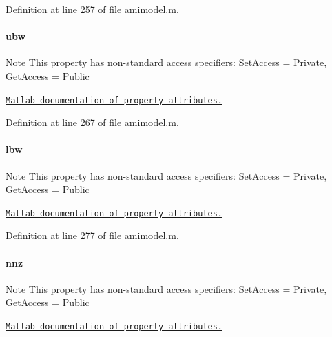 Definition at line 257 of file amimodel.\+m.

\hypertarget{classamimodel_a955c9d10635afed4ebc04c60010e5d40}{}
\paragraph[{ubw}]{\setlength{\rightskip}{0pt plus 5cm}ubw}\label{classamimodel_a955c9d10635afed4ebc04c60010e5d40}
\begin{DoxyNote}{Note}
This property has non-\/standard access specifiers\+: {\ttfamily Set\+Access = Private, Get\+Access = Public} 

\href{http://www.mathworks.com/help/matlab/matlab_oop/property-attributes.html}{\tt Matlab documentation of property attributes.} 
\end{DoxyNote}


Definition at line 267 of file amimodel.\+m.

\hypertarget{classamimodel_a784f5fb2b8eda576179be087c2a09a39}{}
\paragraph[{lbw}]{\setlength{\rightskip}{0pt plus 5cm}lbw}\label{classamimodel_a784f5fb2b8eda576179be087c2a09a39}
\begin{DoxyNote}{Note}
This property has non-\/standard access specifiers\+: {\ttfamily Set\+Access = Private, Get\+Access = Public} 

\href{http://www.mathworks.com/help/matlab/matlab_oop/property-attributes.html}{\tt Matlab documentation of property attributes.} 
\end{DoxyNote}


Definition at line 277 of file amimodel.\+m.

\hypertarget{classamimodel_a825ec588729c090ff51ea3473dcbc6b9}{}
\paragraph[{nnz}]{\setlength{\rightskip}{0pt plus 5cm}nnz}\label{classamimodel_a825ec588729c090ff51ea3473dcbc6b9}
\begin{DoxyNote}{Note}
This property has non-\/standard access specifiers\+: {\ttfamily Set\+Access = Private, Get\+Access = Public} 

\href{http://www.mathworks.com/help/matlab/matlab_oop/property-attributes.html}{\tt Matlab documentation of property attributes.} 
\end{DoxyNote}


